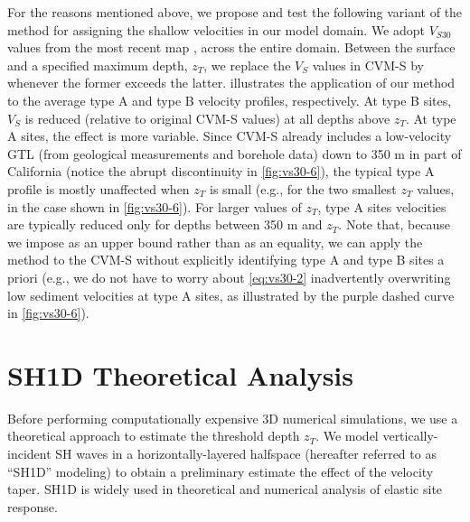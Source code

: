 For the reasons mentioned above, we propose and test the following variant of the \citet{elyVs30derivedNearsurfaceSeismic2010} method for assigning the shallow velocities in our model domain. We adopt $V_{S30}$ values from the most recent map \citep[i.e.,][]{thompsonUpdatedVs30Map2018}, across the entire domain. Between the surface and a specified maximum depth, $z_T$, we replace the $V_S$ values in CVM-S by  whenever the former exceeds the latter.  illustrates the application of our method to the average type A and type B velocity profiles, respectively. At type B sites, $V_S$ is reduced (relative to original CVM-S values) at all depths above $z_T$. At type A sites, the effect is more variable. Since CVM-S already includes a low-velocity GTL (from geological measurements and borehole data) down to 350 m in part of California (notice the abrupt discontinuity in \cref{fig:vs30-6}), the typical type A profile is mostly unaffected when $z_T$ is small (e.g., for the two smallest $z_T$ values, in the case shown in \cref{fig:vs30-6}). For larger values of $z_T$, type A sites velocities are typically reduced only for depths between 350 m and $z_T$. Note that, because we impose  as an upper bound rather than as an equality, we can apply the method to the CVM-S without explicitly identifying type A and type B sites a priori (e.g., we do not have to worry about \cref{eq:vs30-2} inadvertently overwriting low sediment velocities at type A sites, as illustrated by the purple dashed curve in \cref{fig:vs30-6}).

\section{SH1D Theoretical Analysis}
Before performing computationally expensive 3D numerical simulations, we use a theoretical approach to estimate the threshold depth $z_T$. We model vertically-incident SH waves in a horizontally-layered halfspace (hereafter referred to as ``SH1D'' modeling) to obtain a preliminary estimate the effect of the velocity taper. SH1D is widely used in theoretical  and numerical  analysis of elastic site response.

